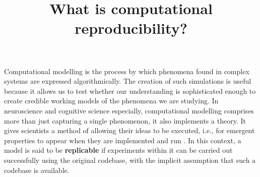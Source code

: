 \documentclass[jou]{apa6}
\title{What is computational reproducibility?}
\begin{document}
\maketitle



%


Computational modelling is the process by which phenomena found in complex systems are expressed algorithmically.
The creation of such simulations is useful because it allows us to test whether our understanding is sophisticated enough to create credible working models of the phenomena we are studying.
In neuroscience and cognitive science especially, computational modelling comprises more than just capturing a single phenomenon, it also  implements a theory.
It gives scientists a method of allowing their ideas to be executed, i.e., for emergent properties to appear when they are implemented and run \cite{mcclelland09}.
In this context, a model is said to be  \textbf{replicable} if experiments within it can be carried out successfully using the original codebase, with the implicit assumption that such a codebase is available.\\
\end{document}
